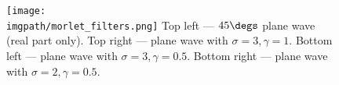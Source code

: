   \begin{figure}
    \begin{center}
      \texttt{[image: \\imgpath/morlet\_filters.png]}
              {Top left --- $45\degs$ plane wave (real part only). Top right --- plane wave with
              $\sigma=3,\gamma=1$. Bottom left --- plane wave with $\sigma=3,\gamma=0.5$. Bottom
            right --- plane wave with $\sigma=2,\gamma=0.5$.}
      \label{fig:ch2:morlet_filters}
    \end{center}
  \end{figure}

